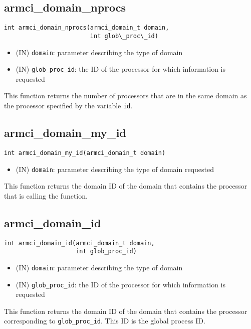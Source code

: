 \documentclass[12pt]{article}
\begin{document}
\subsection{armci\_domain\_nprocs}
\begin{verbatim}
int armci_domain_nprocs(armci_domain_t domain,
                        int glob\_proc\_id)
\end{verbatim}
\begin{itemize}
\item (IN) \texttt{domain}: parameter describing the type of domain
\item (IN) \texttt{glob\_proc\_id}: the ID of the processor for which
information is requested
\end{itemize}
This function returns the number of processors that are in the same domain as
the processor specified by the variable \texttt{id}.

\subsection{armci\_domain\_my\_id}
\begin{verbatim}
int armci_domain_my_id(armci_domain_t domain)
\end{verbatim}
\begin{itemize}
\item (IN) \texttt{domain}: parameter describing the type of domain
requested
\end{itemize}
This function returns the domain ID of the domain that contains the processor
that is calling the function.

\subsection{armci\_domain\_id}
\begin{verbatim}
int armci_domain_id(armci_domain_t domain,
                    int glob_proc_id)
\end{verbatim}
\begin{itemize}
\item (IN) \texttt{domain}: parameter describing the type of domain
\item (IN) \texttt{glob\_proc\_id}: the ID of the processor for which information is
requested
\end{itemize}
This function returns the domain ID of the domain that contains the processor
corresponding to \texttt{glob\_proc\_id}. This ID is the global process ID.
\end{document}
